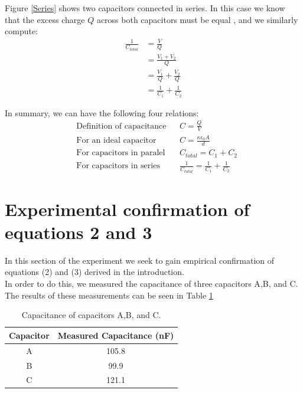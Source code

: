 \documentclass[oneside,12pt]{amsart}
\begin{document}
	\indent Figure \ref{Series} shows two capacitors connected in series. In this case we know that the excess charge $Q$ across both capacitors must be equal \cite{cap}, and we similarly compute:\\
	\begin{align*}
		\frac{1}{C_{total}} &= \frac{V}{Q}\\
		&= \frac{V_1 + V_2}{Q}\\
		&= \frac{V_1}{Q} + \frac{V_2}{Q}\\
		&= \frac{1}{C_1} + \frac{1}{C_2}
	\end{align*}


	\indent In summary, we can have the following four relations:
	\begin{align}
	&\text{Definition of capacitance} &&	C = \frac{Q}{V}\\
	&\text{For an ideal capacitor} &&C = \frac{\kappa \epsilon _{0}A}{d}\\
	&\text{For capacitors in paralel} &&C_{total} = C_1 + C_2\\
	&\text{For capacitors in series} && \frac{1}{C_{total}} = \frac{1}{C_1}+\frac{1}{C_2}
	\end{align}
	
	\section{Experimental confirmation of equations 2 and 3}
	\indent In this section of the experiment we seek to gain empirical confirmation of equations (2) and (3) derived in the introduction.\\
	
	\indent In order to do this, we measured the capacitance of three capacitors A,B, and C. The results of these measurements can be seen in Table \ref{abc} 

	\begin{table}[H]
		\begin{tabular}{ |c|c|}
			\hline
			Capacitor & Measured Capacitance (nF)\\
			\hline
			A&105.8\\
			B&99.9\\
			C&121.1\\
			\hline
		\end{tabular}
		\caption{Capacitance of capacitors A,B, and C.}
		\label{abc}
	\end{table}
\end{document}
